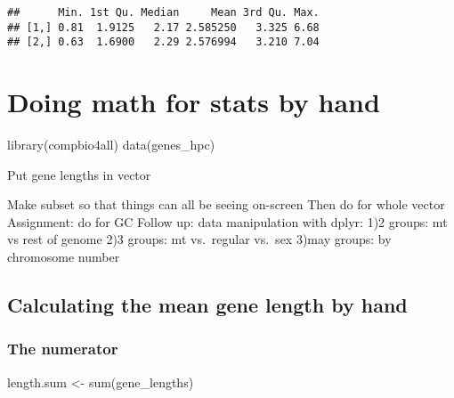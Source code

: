 \documentclass[
]{book}
\newenvironment{Shaded}{\begin{snugshade}}{\end{snugshade}}
\newcommand{\FunctionTok}[1]{\textcolor[rgb]{0.00,0.00,0.00}{#1}}
\newcommand{\NormalTok}[1]{#1}
\newcommand{\OtherTok}[1]{\textcolor[rgb]{0.56,0.35,0.01}{#1}}
\newcommand{\SpecialCharTok}[1]{\textcolor[rgb]{0.00,0.00,0.00}{#1}}
\begin{document}
\begin{verbatim}
##      Min. 1st Qu. Median     Mean 3rd Qu. Max.
## [1,] 0.81  1.9125   2.17 2.585250   3.325 6.68
## [2,] 0.63  1.6900   2.29 2.576994   3.210 7.04
\end{verbatim}

\hypertarget{doing-math-for-stats-by-hand}{%
\section{Doing math for stats by hand}\label{doing-math-for-stats-by-hand}}

\begin{Shaded}
\begin{Highlighting}[]
\FunctionTok{library}\NormalTok{(compbio4all)}
\FunctionTok{data}\NormalTok{(genes\_hpc)}
\end{Highlighting}
\end{Shaded}

Put gene lengths in vector

\begin{Shaded}
\end{Shaded}

Make subset so that things can all be seeing on-screen
Then do for whole vector
Assignment: do for GC
Follow up: data manipulation with dplyr:
1)2 groups: mt vs rest of genome
2)3 groups: mt vs.~regular vs.~sex
3)may groups: by chromosome number

\hypertarget{calculating-the-mean-gene-length-by-hand}{%
\subsection{Calculating the mean gene length by hand}\label{calculating-the-mean-gene-length-by-hand}}

\hypertarget{the-numerator}{%
\subsubsection{The numerator}\label{the-numerator}}

\begin{Shaded}
\begin{Highlighting}[]
\NormalTok{length.sum }\OtherTok{\textless{}{-}} \FunctionTok{sum}\NormalTok{(gene\_lengths)}
\end{Highlighting}
\end{Shaded}
\end{document}
